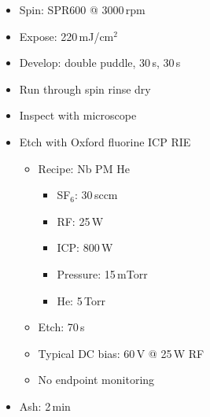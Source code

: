 \begin{itemize}
\item Spin: SPR600 @ 3000\,rpm
\item Expose: 220\,mJ/cm$^2$
\item Develop: double puddle, 30\,s, 30\,s
\item Run through spin rinse dry
\item Inspect with microscope
\item Etch with Oxford fluorine ICP RIE
\begin{itemize}
\item Recipe: Nb PM He
\begin{itemize}
\item SF$_6$: 30\,sccm
\item RF: 25\,W
\item ICP: 800\,W
\item Pressure: 15\,mTorr
\item He: 5\,Torr
\end{itemize}
\item Etch: 70\,s
\item Typical DC bias: 60\,V @ 25\,W RF
\item No endpoint monitoring
\end{itemize}
\item Ash: 2\,min
\end{itemize}